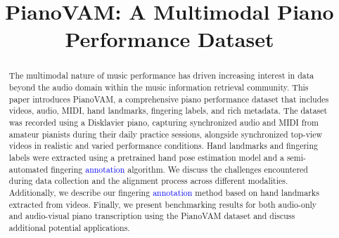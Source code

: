 \documentclass{article}
\title{PianoVAM: A Multimodal Piano Performance Dataset}
\newcommand{\alex}[1]{\textcolor{blue}{#1}}%
\begin{document}
\maketitle

\begin{abstract}

The multimodal nature of music performance has driven increasing interest in data beyond the audio domain within the music information retrieval  community.
This paper introduces PianoVAM, a comprehensive piano performance dataset that includes videos, audio, MIDI, hand landmarks, fingering labels, and rich metadata.
The dataset was recorded using a Disklavier piano, capturing synchronized audio and MIDI from amateur pianists during their daily practice sessions, alongside synchronized top-view videos in realistic and varied performance conditions. 
Hand landmarks and fingering labels were extracted using a pretrained hand pose estimation model and a semi-automated fingering \alex{annotation} algorithm.
We discuss the challenges encountered during data collection and the alignment process across different modalities. Additionally, we describe our fingering \alex{annotation} method based on hand landmarks extracted from videos.
Finally, we present benchmarking results for both audio-only and audio-visual piano transcription using the PianoVAM dataset and discuss additional potential applications. 
\end{abstract}
\end{document}
